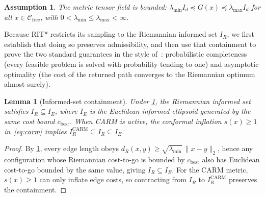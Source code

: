 \documentclass[journal]{IEEEtran}
\newtheorem{lemma}[theorem]{Lemma}
\newtheorem{assumption}{Assumption}
\newcommand{\Cfree}{\mathcal{C}_{\mathrm{free}}}
\newcommand{\IR}{I_{\!R}}
\newcommand{\IE}{I_{\!E}}
\newcommand{\dR}{d_{\!R}}
\begin{document}
\begin{assumption}\label{assum:bounded}
The metric tensor field is bounded:
$\lambda_{\min} I_d \preceq G(x) \preceq \lambda_{\max} I_d$
for all $x \in \Cfree$, with $0 < \lambda_{\min} \le \lambda_{\max} < \infty$.
\end{assumption}

Because RIT* restricts its sampling to the Riemannian informed set
$\IR$, we first establish that doing so preserves admissibility, and
then use that containment to prove the two standard guarantees in
the style of~\cite{Gammell2018}: probabilistic completeness (every
feasible problem is solved with probability tending to one) and
asymptotic optimality (the cost of the returned path converges to
the Riemannian optimum almost surely).

\begin{lemma}[Informed-set containment]\label{lem:containment}
Under \cref{assum:bounded}, the Riemannian informed set
satisfies $\IR \subseteq \IE$, where $\IE$ is the Euclidean
informed ellipsoid generated by the same cost bound
$c_{\mathrm{best}}$.  When CARM is active, the conformal inflation
$s(x) \ge 1$ in~\eqref{eq:carm} implies
$\IR^{\mathrm{CARM}} \subseteq \IR \subseteq \IE$.
\end{lemma}
\begin{proof}
By \cref{assum:bounded}, every edge length obeys
$\dR(x,y) \ge \sqrt{\lambda_{\min}}\,\|x-y\|_2$, hence any
configuration whose Riemannian cost-to-go is bounded by
$c_{\mathrm{best}}$ also has Euclidean cost-to-go bounded by the
same value, giving $\IR \subseteq \IE$.  For the CARM metric,
$s(x) \ge 1$ can only inflate edge costs, so contracting from
$\IR$ to $\IR^{\mathrm{CARM}}$ preserves the containment.
\end{proof}
\end{document}
